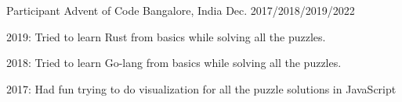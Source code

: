 

\begin{cventries}

  \cventry
    {Participant} %
    {Advent of Code} %
    {Bangalore, India} %
    {Dec. 2017/2018/2019/2022} %
    {
      \begin{cvitems} %
        \item {2019: Tried to learn Rust from basics while solving all the puzzles.}
        \item {2018: Tried to learn Go-lang from basics while solving all the puzzles.}
        \item {2017: Had fun trying to do visualization for all the puzzle solutions in JavaScript}
      \end{cvitems}
    }
\end{cventries}
